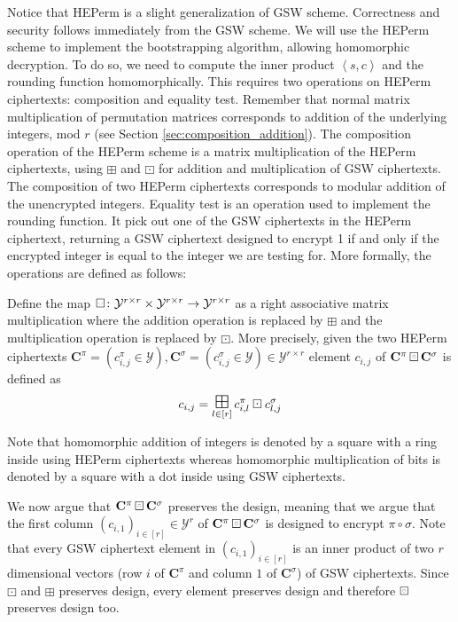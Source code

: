 Notice that HEPerm is a slight generalization of GSW scheme. Correctness and security follows immediately from the GSW scheme. We will use the HEPerm scheme to implement the bootstrapping algorithm, allowing homomorphic decryption. To do so, we need to compute the inner product $\left \langle s,c \right \rangle$ and the rounding function homomorphically. This requires two operations on HEPerm ciphertexts: composition and equality test. Remember that normal matrix multiplication of permutation matrices corresponds to addition of the underlying integers, mod $r$ (see Section \ref{sec:composition_addition}). The composition operation of the HEPerm scheme is a matrix multiplication of the HEPerm ciphertexts, using $\boxplus$ and $\boxdot$ for addition and multiplication of GSW ciphertexts. The composition of two HEPerm ciphertexts corresponds to modular addition of the unencrypted integers. Equality test is an operation used to implement the rounding function. It pick out one of the GSW ciphertexts in the HEPerm ciphertext, returning a GSW ciphertext designed to encrypt 1 if and only if the encrypted integer is equal to the integer we are testing for. More formally, the operations are defined as follows:
\begin{definition}
    Define the map $\boxring \colon \mathcal{Y}^{r \times r} \times \mathcal{Y}^{r \times r} \to \mathcal{Y}^{r \times r}$ as a right associative matrix multiplication where the addition operation is replaced by $\boxplus$ and the multiplication operation is replaced by $\boxdot$. More precisely, given the two HEPerm ciphertexts $\mathbf{C}^{\pi} = (c_{i,j}^{\pi} \in \mathcal{Y}), \mathbf{C}^{\sigma} = (c_{i,j}^{\sigma} \in \mathcal{Y}) \in \mathcal{Y}^{r \times r}$ element $c_{i,j}$ of $\mathbf{C}^{\pi} \boxring \mathbf{C}^{\sigma}$ is defined as
    \begin{equation}\label{HEPerm_composition}
        c_{i,j} = \bigboxplus\limits_{l \in [r]} c_{i,l}^{\pi} \boxdot c_{l,j}^{\sigma}
    \end{equation}
\end{definition}
\begin{remark}
    Note that homomorphic addition of integers is denoted by a square with a ring inside using HEPerm ciphertexts whereas homomorphic multiplication of bits is denoted by a square with a dot inside using GSW ciphertexts.
\end{remark}
We now argue that $\mathbf{C}^{\pi} \boxring \mathbf{C}^{\sigma}$ preserves the design, meaning that we argue that the first column $(c_{i,1})_{i \in [r]} \in \mathcal{Y}^r$ of $\mathbf{C}^{\pi} \boxring \mathbf{C}^{\sigma}$ is designed to encrypt $\pi \circ \sigma$. Note that every GSW ciphertext element in $(c_{i,1})_{i \in [r]}$ is an inner product of two $r$ dimensional vectors (row $i$ of $\mathbf{C}^{\pi}$ and column $1$ of $\mathbf{C}^{\sigma}$) of GSW ciphertexts. Since $\boxdot$ and $\boxplus$ preserves design, every element preserves design and therefore $\boxring$ preserves design too. 

